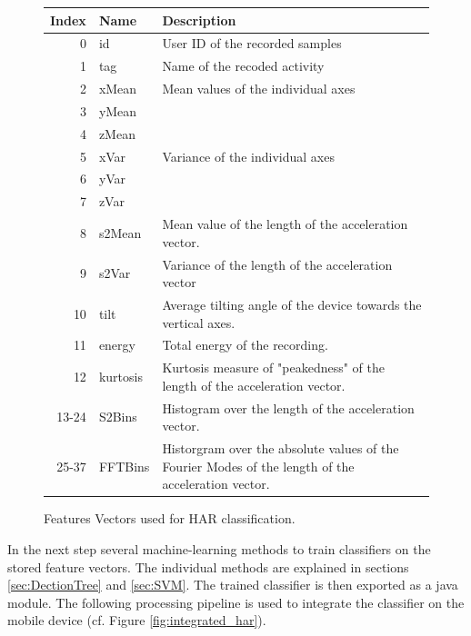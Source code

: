 \begin{figure}
\centering
\begin{tabular}{|r|l|p{10cm}|} \hline
Index & Name     & Description \\ \hline
0            & id       & User ID of the recorded samples \\ \hline
1            & tag      & Name of the recoded activity    \\ \hline
2            & xMean    & Mean values of the individual axes \\ 
3            & yMean    &             \\ 
4            & zMean    &             \\ \hline
5            & xVar     & Variance of the individual axes  \\ 
6            & yVar     &             \\ 
7            & zVar     &             \\ \hline
8            & s2Mean   & Mean value of the length of the acceleration
                          vector. \\ \hline
9            & s2Var    & Variance of the length of the acceleration
                          vector \\ \hline
10           & tilt     & Average tilting angle of the device towards
                          the vertical axes. \\ \hline
11           & energy   & Total energy of the recording.  \\ \hline
12           & kurtosis & Kurtosis measure of "peakedness" of the
                          length of the acceleration vector. \\ \hline
13-24        & S2Bins   & Histogram over the length of the
                          acceleration vector. \\ \hline
25-37        & FFTBins  & Historgram over the absolute values of the
                          Fourier Modes of the length of the
                          acceleration vector. \\ \hline
\end{tabular}
\caption{Features Vectors used for HAR classification.}
\label{fig:har_features}
\end{figure}

In the next step several machine-learning methods to train classifiers
on the stored feature vectors. The individual methods are explained in
sections \ref{sec:DectionTree} and \ref{sec:SVM}.  The trained
classifier is then exported as a java module. The following processing
pipeline is used to integrate the classifier on the mobile device
(cf. Figure \ref{fig:integrated_har}).


